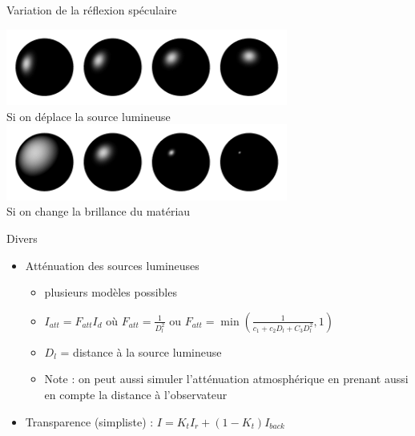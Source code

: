 \begin{frame}[t]{Variation de la réflexion spéculaire}
  \begin{center}
\includegraphics[height=2.5cm]{figs/spec3.png} \\
Si on déplace la source  lumineuse
\includegraphics[height=2.5cm]{figs/spec4.png} \\
Si on change la brillance du matériau

  \end{center}
\end{frame}
\begin{frame}[t]{Divers}
  \begin{itemize}
    \item Atténuation des sources lumineuses
    \begin{itemize}
      \item plusieurs modèles possibles
      \item $I_{att} = F_{att} I_d$ où $F_{att} = \frac{1}{D_l^2}$ ou $F_{att} = \min \left( \frac{1}{c_1+c_2D_l+C_3D_l^2},1 \right) $
      \item $D_l$ = distance à la source lumineuse
      \item Note : on peut aussi simuler l'atténuation atmosphérique en prenant aussi en compte la distance à l'observateur
    \end{itemize}
    \item Transparence (simpliste) : $I = K_tI_r + (1-K_t)I_{back} $
  \end{itemize}
\end{frame}

